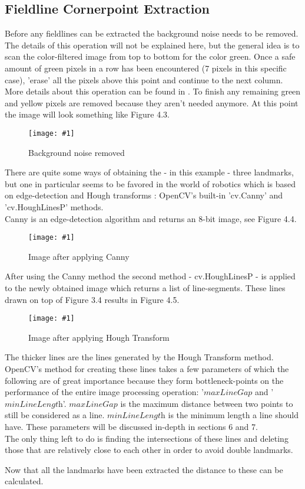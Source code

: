 \documentclass{ba-kecs}
\numberwithin{figure}{section}
\numberwithin{equation}{section}
\newcommand{\dkepic}[2]{ %
	\begin{figure}[H] %
	\texttt{[image: \#1]}
	\caption{#2}
	\label{#1}
	\end{figure}
}
\begin{document}
\subsection{Fieldline Cornerpoint Extraction}
Before any fieldlines can be extracted the background noise needs to be removed. The details of this operation will not be explained here, but the general idea is to scan the color-filtered image from top to bottom for the color green. Once a safe amount of green pixels in a row has been encountered (7 pixels in this specific case), 'erase' all the pixels above this point and continue to the next column. More details about this operation can be found in \cite{ref1}. To finish any remaining green and yellow pixels are removed because they aren't needed anymore. At this point the image will look something like Figure 4.3.\\
\dkepic{figure_IP3}{Background noise removed}
There are quite some ways of obtaining the - in this example - three landmarks, but one in particular seems to be favored in the world of robotics which is based on edge-detection and Hough transforms \cite{ref2}\cite{ref3}: OpenCV's built-in 'cv.Canny' and 'cv.HoughLinesP' methods. \\
Canny is an edge-detection algorithm and returns an 8-bit image, see Figure 4.4.\\
\dkepic{figure_IP4}{Image after applying Canny}
After using the Canny method the second method - cv.HoughLinesP - is applied to the newly obtained image which returns a list of line-segments. These lines drawn on top of Figure 3.4 results in Figure 4.5.\\
\dkepic{figure_IP5}{Image after applying Hough Transform}
The thicker lines are the lines generated by the Hough Transform method.
OpenCV's method for creating these lines takes a few parameters of which the following are of great importance because they form bottleneck-points on the performance of the entire image processing operation: '$\textit{maxLineGap}$ and '$\textit{minLineLength}$'. $\textit{maxLineGap}$ is the maximum distance between two points to still be considered as a line. $\textit{minLineLength}$ is the minimum length a line should have. These parameters will be discussed in-depth in sections 6 and 7. \\
The only thing left to do is finding the intersections of these lines and deleting those that are relatively close to each other in order to avoid double landmarks.


Now that all the landmarks have been extracted the distance to these can be calculated. 
\end{document}
